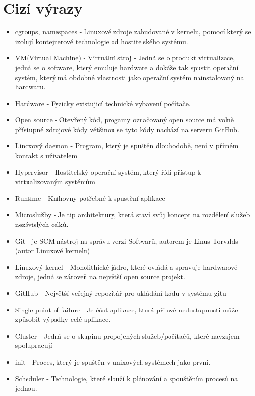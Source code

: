 \appendix
{}

\chapter{Cizí výrazy}
\begin{itemize}
\item cgroups, namespaces - Linuxové zdroje zabudované v kernelu, pomocí který se izolují kontejnerové technologie od hostitelského systému.
\item VM(Virtual Machine) - Virtuální stroj - Jedná se o produkt virtualizace, jedná se o software, který emuluje hardware a dokáže tak spustit operační systém, který má obdobné vlastnosti jako operační systém nainstalovaný na hardwaru.
\item Hardware - Fyzicky existujicí technické vybavení počítače.
\item Open source - Otevřený kód, progamy označovaný open source má volně přístupné zdrojové kódy většinou se tyto kódy nachází na serveru GitHub.
\item Linoxový daemon - Program, který je spuštěn dlouhodobě, není v přímém kontakt s uživatelem
\item Hypervisor - Hostitelský operační systém, který řídí přístup k virtualizovaným systémům
\item Runtime - Knihovny potřebné k spustění aplikace
\item Microslužby - Je tip architektury, která staví svůj koncept na rozdělení služeb nezávislých celků. 
\item Git - je SCM nástroj na správu verzi Softwarů, autorem je Linus Torvalds (autor Linuxové kernelu) 
\item Linuxový kernel - Monolithické jádro, které ovládá a spravuje hardwarové zdroje, jedná se zároveň na největší open source projekt. 
\item GitHub - Největší veřejný repozitář pro ukládání kódu v systému gitu.
\item Single point of failure - Je část aplikace, která při své nedostupnosti může způsobit výpadky celé aplikace.
\item Cluster - Jedná se o skupinu propojených služeb/počítačů, které navzájem spolupracují
\item init - Proces, který je spuštěn v unixových systémech jako první.
\item Scheduler - Technologie, které slouží k plánování a spouštěním procesů na jednou. 
\end{itemize}
